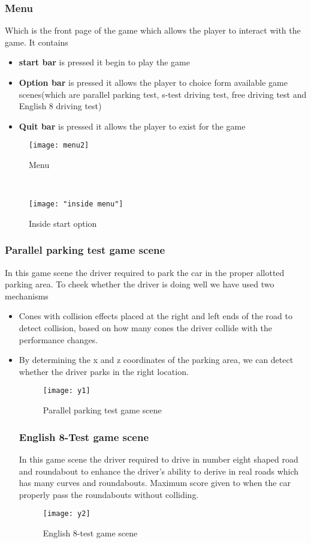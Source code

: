\documentclass[12pt,a4paper]{article}
\begin{document}
\begin{center}
\begin{center}
\begin{center}
\subsubsection{Menu}
Which is the front page of the game which allows the player to interact with the game. It contains
\begin{itemize}
	\item \textbf{start bar} is pressed it begin to play the game
	\item 	\textbf{Option bar} is pressed it allows the player to choice form available game scenes(which are parallel parking test, s-test driving test, free driving test and English 8 driving test)
	\item \textbf{Quit bar} is pressed  it allows the player to exist for the game
\end{itemize}	  
   \begin{figure}
   	\centering
   	\texttt{[image: menu2]}
   	\caption{Menu}
   	\label{fig:menu2}
   \end{figure}
\\
\begin{figure}
	\centering
	\texttt{[image: "inside menu"]}
	\caption{Inside start option}
	\label{fig:inside-menu}
\end{figure}

   
\subsubsection{Parallel parking test game scene}
In this game scene the driver required to park the car in the proper allotted parking area.
To cheek whether the driver is doing well we have used two mechanisms 
\begin{itemize}
	\item Cones with collision effects placed at the right and left ends of the road to detect collision, based on how many cones the driver collide with the performance changes.
	\item By determining the x and z coordinates of the parking area, we can detect whether the driver parks in the right location.
	
\begin{figure}
	\centering
	\texttt{[image: y1]}
	\caption{Parallel parking test game scene}
	\label{fig:y1}
\end{figure}

\subsubsection{English 8-Test game scene}
In this game scene the driver required to drive in number eight shaped road and roundabout to enhance the driver’s ability to derive in real roads which has many curves and roundabouts. Maximum score given to when the car properly pass the roundabouts without colliding.
\begin{figure}
	\centering
	\texttt{[image: y2]}
	\caption{English 8-test game scene}
	\label{fig:y2}
\end{figure}



\end{itemize}
\end{center}
\end{center}
\end{center}
\end{document}

